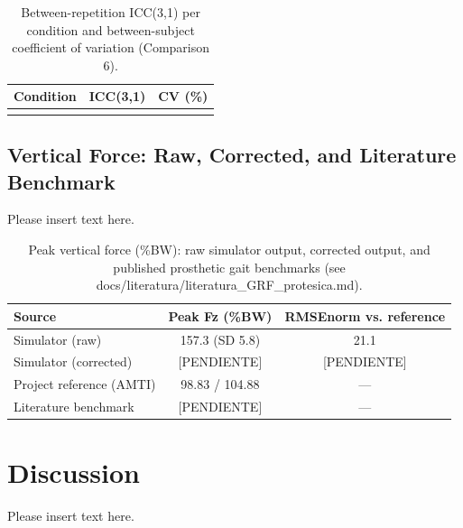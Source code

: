 \documentclass[journal,twocolumn,letterpaper]{IEEEJERM}
\begin{document}
\begin{table}[!t]
\caption{Between-repetition ICC(3,1) per condition and between-subject
coefficient of variation (Comparison 6).}
\label{tab:comparacion6}
\centering
\begin{tabular}{lcc}
\hline
Condition & ICC(3,1) & CV (\%) \\
\hline
[PENDIENTE] & & \\
\hline
\end{tabular}
\end{table}

\subsection*{Vertical Force: Raw, Corrected, and Literature Benchmark}
Please insert text here.

\begin{table}[!t]
\caption{Peak vertical force (\%BW): raw simulator output, corrected
output, and published prosthetic gait benchmarks
(see docs/literatura/literatura\_GRF\_protesica.md).}
\label{tab:fuerza}
\centering
\begin{tabular}{lcc}
\hline
Source & Peak Fz (\%BW) & RMSEnorm vs. reference \\
\hline
Simulator (raw) & 157.3 (SD 5.8) & 21.1 \\
Simulator (corrected) & [PENDIENTE] & [PENDIENTE] \\
Project reference (AMTI) & 98.83 / 104.88 & --- \\
Literature benchmark & [PENDIENTE] & --- \\
\hline
\end{tabular}
\end{table}

\section{Discussion}
Please insert text here.
\end{document}
